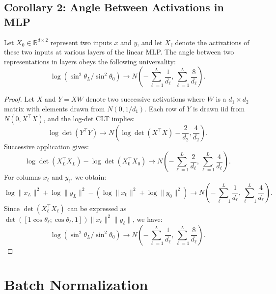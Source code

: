 \subsection{Corollary 2: Angle Between Activations in MLP}

\begin{corollary}
Let \( X_0 \in \mathbb{R}^{d \times 2} \) represent two inputs \( x \) and \( y \), and let \( X_\ell \) denote the activations of these two inputs at various layers of the linear MLP. The angle between two representations in layers obeys the following universality:
\begin{equation}
\log(\sin^2\theta_L/\sin^2\theta_0) \to N\left(-\sum_{\ell=1}^L\frac{1}{d_\ell}, \sum_{\ell=1}^L \frac{8}{d_\ell}\right).
\end{equation}
\end{corollary}

\begin{proof}
Let \( X \) and \( Y = X W \) denote two successive activations where \( W \) is a \( d_1 \times d_2 \) matrix with elements drawn from \( N(0, 1/d_1) \). Each row of \( Y \) is drawn iid from \( N(0, X^\top X) \), and the log-det CLT implies:
\begin{equation}
\log \det(Y^\top Y) \to N(\log \det(X^\top X) - \frac{2}{d_2}, \frac{4}{d_2}).
\end{equation}
Successive application gives:
\begin{equation}
\log \det(X_L^\top X_L) - \log \det(X_0^\top X_0) \to N\left(-\sum_{\ell=1}^L \frac{2}{d_\ell}, \sum_{\ell=1}^L \frac{4}{d_\ell}\right).
\end{equation}
For columns \( x_\ell \) and \( y_\ell \), we obtain:
\begin{equation}
\log \|x_L\|^2 + \log \|y_L\|^2 - (\log \|x_0\|^2 + \log \|y_0\|^2) \to N\left(-\sum_{\ell=1}^L \frac{1}{d_\ell}, \sum_{\ell=1}^L \frac{4}{d_\ell}\right).
\end{equation}
Since \( \det(X_\ell^\top X_\ell) \) can be expressed as \( \det([1 \cos\theta_\ell; \cos\theta_\ell, 1]) \|x_\ell\|^2 \|y_\ell\| \), we have:
\begin{equation}
\log(\sin^2\theta_L/\sin^2\theta_0) \to N\left(-\sum_{\ell=1}^L\frac{1}{d_\ell}, \sum_{\ell=1}^L \frac{8}{d_\ell}\right).
\end{equation}
\end{proof}

\section{Batch Normalization}

